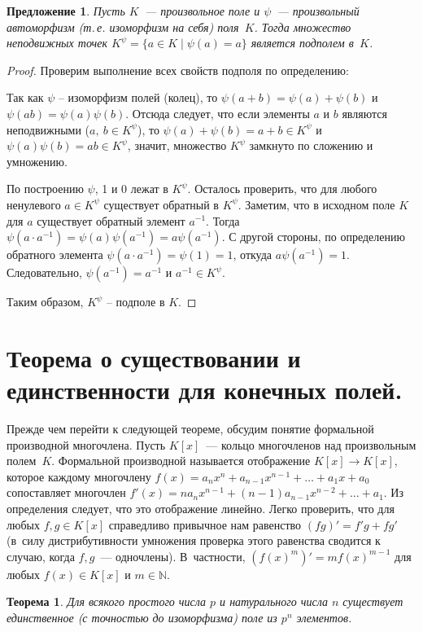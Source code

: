 \documentclass[a4paper, 12pt]{article}
\def\NN{{\mathbb N}}%
\newtheorem{theorem}{Теорема}
\newtheorem{proposition}{Предложение}
\theoremstyle{definition}
\theoremstyle{remark}
\begin{document}
\begin{proposition}
Пусть $K$~--- произвольное поле и $\psi$~--- произвольный
автоморфизм (т.\,е. изоморфизм на себя) поля~$K$. Тогда множество неподвижных точек $K^{\psi} = \{ a \in K \mid \psi(a) =
a\}$ является подполем в~$K$.
\end{proposition}
\begin{proof}
Проверим выполнение всех свойств подполя по определению:
\smallskip

Так как $\psi$ -- изоморфизм полей (колец), то $\psi(a + b) = \psi(a) + \psi(b)$ и $\psi(ab) = \psi(a)\psi(b)$. Отсюда следует, что если элементы  $a$ и $b$ являются неподвижными ($a,\ b \in K^{\psi}$), то  $\psi(a) + \psi(b) = a + b \in K^{\psi}$ и  $\psi(a)\psi(b) = ab \in K^{\psi}$, значит, множество $K^{\psi}$ замкнуто по сложению и умножению.
\smallskip

По построению $\psi$, 1 и 0 лежат в $K^{\psi}$. Осталось проверить, что для любого ненулевого $a \in K^{\psi}$ существует обратный в $K^{\psi}$. Заметим, что в исходном поле $K$ для $a$ существует обратный элемент $a^{-1}$. Тогда $\psi(a \cdot a^{-1}) = \psi(a)\psi(a^{-1}) = a\psi(a^{-1})$. С другой стороны, по определению обратного элемента $\psi(a \cdot a^{-1}) = \psi(1) = 1$, откуда $a\psi(a^{-1}) = 1$. Следовательно, $\psi(a^{-1}) = a^{-1}$ и $a^{-1} \in  K^{\psi}$.
\smallskip

Таким образом, $ K^{\psi}$ -- подполе в $K$.
\end{proof}

\section{Теорема о существовании и единственности для конечных полей.}

Прежде чем перейти к следующей теореме, обсудим понятие формальной
производной многочлена. Пусть $K[x]$~--- кольцо многочленов над
произвольным полем~$K$. Формальной производной называется
отображение $K[x] \to K[x]$, которое каждому многочлену $f(x) =
a_nx^n + a_{n-1}x^{n-1} + \ldots + a_1 x + a_0$ сопоставляет
многочлен $f'(x) = na_n x^{n-1} + (n-1)a_{n-1}x^{n-2} + \ldots +
a_1$. Из определения следует, что это отображение линейно. Легко
проверить, что для любых $f,g \in K[x]$ справедливо привычное нам
равенство $(fg)' = f'g + fg'$ (в~силу дистрибутивности умножения
проверка этого равенства сводится к случаю, когда $f,g$~---
одночлены). В~частности, $(f(x)^m)' = mf(x)^{m-1}$ для любых $f(x)
\in K[x]$ и $m \in \NN$.

\begin{theorem} \label{thm2}
Для всякого простого числа $p$ и натурального числа $n$ существует
единственное \textup(с точностью до изоморфизма\textup) поле из
$p^n$ элементов.
\end{theorem}
\end{document}
